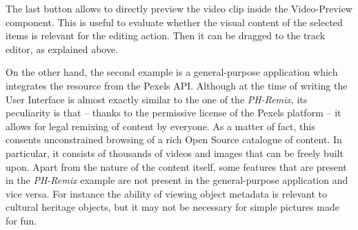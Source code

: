 The last button allows to directly preview the video clip inside the Video-Preview component. This is useful to evaluate whether the visual content of the selected items is relevant for the editing action. Then it can be dragged to the track editor, as explained above.

On the other hand, the second example is a general-purpose application which integrates the resource from the Pexels API. Although at the time of writing the User Interface is almost exactly similar to the one of the \emph{PH-Remix}, its peculiarity is that – thanks to the permissive license of the Pexels platform – it allows for legal remixing of content by everyone.
As a matter of fact, this consents unconstrained browsing of a rich Open Source catalogue of content. In particular, it consists of thousands of videos and images that can be freely built upon. Apart from the nature of the content itself, some features that are present in the \emph{PH-Remix} example are not present in the general-purpose application and vice versa. For instance the ability of viewing object metadata is relevant to cultural heritage objects, but it may not be necessary for simple pictures made for fun.  
